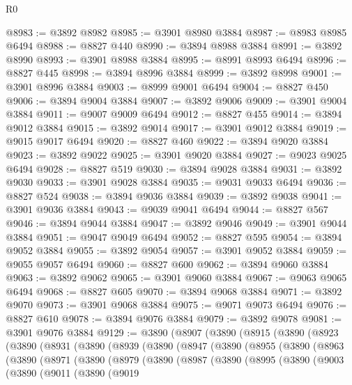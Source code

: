 \begin{lexlean}{R0}
\begin{coremodule}
@8983 := @3892 @8982
@8985 := @3901 @8980 @3884
@8987 := @8983 @8985 @6494
@8988 := @8827 @440
@8990 := @3894 @8988 @3884
@8991 := @3892 @8990
@8993 := @3901 @8988 @3884
@8995 := @8991 @8993 @6494
@8996 := @8827 @445
@8998 := @3894 @8996 @3884
@8999 := @3892 @8998
@9001 := @3901 @8996 @3884
@9003 := @8999 @9001 @6494
@9004 := @8827 @450
@9006 := @3894 @9004 @3884
@9007 := @3892 @9006
@9009 := @3901 @9004 @3884
@9011 := @9007 @9009 @6494
@9012 := @8827 @455
@9014 := @3894 @9012 @3884
@9015 := @3892 @9014
@9017 := @3901 @9012 @3884
@9019 := @9015 @9017 @6494
@9020 := @8827 @460
@9022 := @3894 @9020 @3884
@9023 := @3892 @9022
@9025 := @3901 @9020 @3884
@9027 := @9023 @9025 @6494
@9028 := @8827 @519
@9030 := @3894 @9028 @3884
@9031 := @3892 @9030
@9033 := @3901 @9028 @3884
@9035 := @9031 @9033 @6494
@9036 := @8827 @524
@9038 := @3894 @9036 @3884
@9039 := @3892 @9038
@9041 := @3901 @9036 @3884
@9043 := @9039 @9041 @6494
@9044 := @8827 @567
@9046 := @3894 @9044 @3884
@9047 := @3892 @9046
@9049 := @3901 @9044 @3884
@9051 := @9047 @9049 @6494
@9052 := @8827 @595
@9054 := @3894 @9052 @3884
@9055 := @3892 @9054
@9057 := @3901 @9052 @3884
@9059 := @9055 @9057 @6494
@9060 := @8827 @600
@9062 := @3894 @9060 @3884
@9063 := @3892 @9062
@9065 := @3901 @9060 @3884
@9067 := @9063 @9065 @6494
@9068 := @8827 @605
@9070 := @3894 @9068 @3884
@9071 := @3892 @9070
@9073 := @3901 @9068 @3884
@9075 := @9071 @9073 @6494
@9076 := @8827 @610
@9078 := @3894 @9076 @3884
@9079 := @3892 @9078
@9081 := @3901 @9076 @3884
@9129 := @3890
    (@8907
      (@3890
        (@8915
          (@3890
            (@8923
              (@3890
                (@8931
                  (@3890
                    (@8939
                      (@3890
                        (@8947
                          (@3890
                            (@8955
                              (@3890
                                (@8963
                                  (@3890
                                    (@8971
                                      (@3890
                                        (@8979
                                          (@3890
                                            (@8987
                                              (@3890
                                                (@8995
                                                  (@3890
                                                    (@9003
                                                      (@3890
                                                        (@9011
                                                          (@3890
                                                            (@9019

\end{coremodule}
\end{lexlean}
